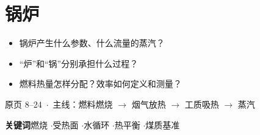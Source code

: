 \section{锅炉}

\begin{frame}[t,shrink]{}
{\begin{itemize}
  \item 锅炉产生什么参数、什么流量的蒸汽？
  \item “炉”和“锅”分别承担什么过程？
  \item 燃料热量怎样分配？效率如何定义和测量？
\end{itemize}}
{原页 8--24 \,$\cdot$\, 主线：燃料燃烧 $\rightarrow$ 烟气放热 $\rightarrow$ 工质吸热 $\rightarrow$ 蒸汽}
\vspace{3mm}
\begin{center}
\small
\textbf{关键词}\quad 燃烧 \enspace$\cdot$\enspace 受热面 \enspace$\cdot$\enspace 水循环 \enspace$\cdot$\enspace 热平衡 \enspace$\cdot$\enspace 煤质基准
\end{center}
\end{frame}

